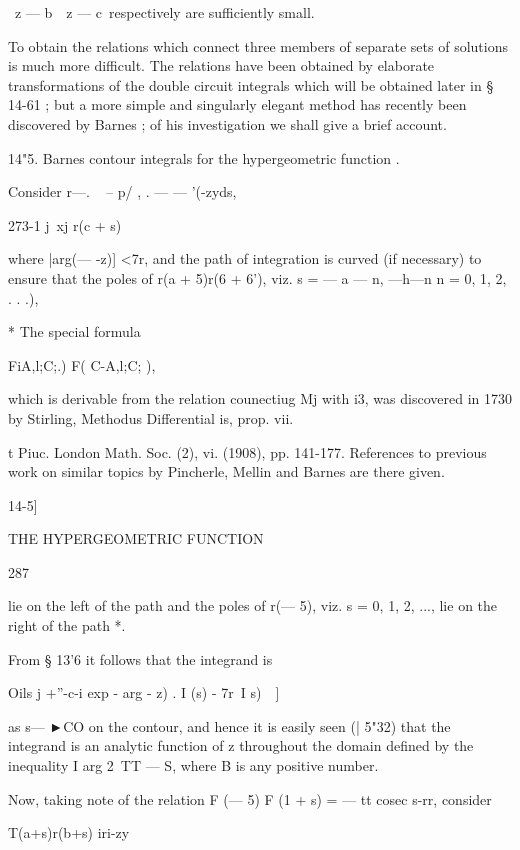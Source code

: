\ z — b\, \ z — c\ respectively are sufficiently small.



To obtain the relations which connect three members of separate sets
of solutions is much more difficult. The relations have been obtained
by elaborate transformations of the double circuit integrals which
will be obtained later in § 14-61 ; but a more simple and singularly
elegant method has recently been discovered by Barnes ; of his
investigation we shall give a brief account.

14"5. Barnes contour integrals for the hypergeometric function .

Consider r—. ~ -- p/ , . — — '(-zyds,

273-1 j\ xj r(c + s)

where |arg(— -z)] <7r, and the path of integration is curved (if
necessary) to ensure that the poles of r(a + 5)r(6 + 6'), viz. s = — a
— n, —h—n n = 0, 1, 2, . . .),

* The special formula

FiA,l;C;.) F( C-A,l;C; ),

which is derivable from the relation counectiug Mj with i3, was
discovered in 1730 by Stirling, Methodus Differential is, prop. vii.

t Piuc. London Math. Soc. (2), vi. (1908), pp. 141-177. References to
previous work on similar topics by Pincherle, Mellin and Barnes are
there given.



14-5]



THE HYPERGEOMETRIC FUNCTION



287



lie on the left of the path and the poles of r(— 5), viz. s = 0, 1, 2,
..., lie on the right of the path *.

From § 13'6 it follows that the integrand is

Oils j +''-c-i exp - arg - z) . I (s) - 7r\ I s)\ \ ]

as s— ►CO on the contour, and hence it is easily seen (| 5"32) that
the integrand is an analytic function of z throughout the domain
defined by the inequality I arg 2\ TT — S, where B is any positive
number.

Now, taking note of the relation F (— 5) F (1 + s) = — tt cosec s-rr,
consider

T(a+s)r(b+s) iri-zy




